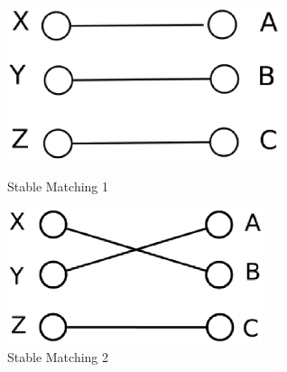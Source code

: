 \documentclass[11pt]{article}
\begin{document}
\begin{CJK}{UTF8}{gbsn}
\begin{figure}[!ht]   %
\begin{minipage}[b]{0.5\linewidth}
   \centering
   \includegraphics[width=8cm]{stable-matching1.eps}
   \caption{Stable Matching 1}
\end{minipage}
\begin{minipage}[b]{0.5\linewidth}
   \centering
   \includegraphics[width=7.5cm]{stable-matching2.eps}
   \caption{Stable Matching 2}
\end{minipage}
\end{figure}

\newpage \end{CJK}
\end{document}
